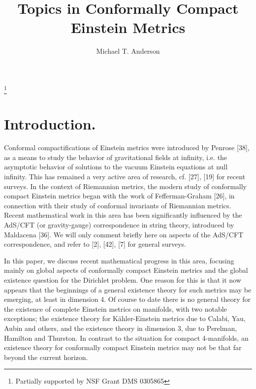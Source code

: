 \documentclass[11pt,amsfonts]{amsart}
\begin{document}
\title[]{Topics in Conformally Compact Einstein Metrics}

\author[]{Michael T. Anderson}

\thanks{Partially supported by NSF Grant DMS 0305865}

\maketitle


\setcounter{section}{0}



\section{Introduction.}
\setcounter{equation}{0}


 Conformal compactifications of Einstein metrics were introduced by 
Penrose [38], as a means to study the behavior of gravitational fields 
at infinity, i.e. the asymptotic behavior of solutions to the vacuum 
Einstein equations at null infinity. This has remained a very active area 
of research, cf. [27], [19] for recent surveys. In the context of Riemannian 
metrics, the modern study of conformally compact Einstein metrics began with the 
work of Fefferman-Graham [26], in connection with their study of 
conformal invariants of Riemannian metrics. Recent mathematical work in 
this area has been significantly influenced by the AdS/CFT (or 
gravity-gauge) correspondence in string theory, introduced by Maldacena 
[36]. We will only comment briefly here on aspects of the AdS/CFT 
correspondence, and refer to [2], [42], [7] for general surveys. 

 In this paper, we discuss recent mathematical progress in this area, 
focusing mainly on global aspects of conformally compact Einstein metrics 
and the global existence question for the Dirichlet problem. One reason for 
this is that it now appears that the beginnings of a general existence theory 
for such metrics may be emerging, at least in dimension 4. Of course to date there 
is no general theory for the existence of complete Einstein metrics on 
manifolds, with two notable exceptions; the existence theory for 
K\"ahler-Einstein metrics due to Calabi, Yau, Aubin and others, and 
the existence theory in dimension 3, due to Perelman, Hamilton and Thurston. 
In contrast to the situation for compact 4-manifolds, an existence theory 
for conformally compact Einstein metrics may not be that far beyond the current 
horizon. 
\end{document}
